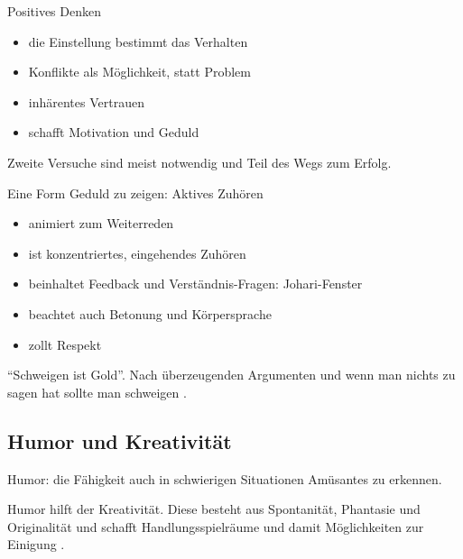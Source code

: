 \begin{frame}

  Positives Denken \cite[][p. 33ff]{mccarthy_advanced_2015}
  \begin{itemize}
    \item die Einstellung bestimmt das Verhalten
    \item Konflikte als Möglichkeit, statt Problem
    \item inhärentes Vertrauen
    \item schafft Motivation und Geduld
  \end{itemize}

  Zweite Versuche sind meist notwendig und Teil des Wegs zum Erfolg. 

\end{frame}

\begin{frame}

  Eine Form Geduld zu zeigen: Aktives Zuhören
  
  \begin{itemize}
    \item animiert zum Weiterreden
    \item ist konzentriertes, eingehendes Zuhören
    \item beinhaltet Feedback und Verständnis-Fragen: Johari-Fenster \cite[][p. 97]{mccarthy_advanced_2015} 
    \item beachtet auch Betonung und Körpersprache
    \item zollt Respekt
  \end{itemize}
    
  \enquote{Schweigen ist Gold}. Nach überzeugenden Argumenten und wenn man nichts zu sagen hat sollte man schweigen \cites{obermeier_karrieresprung_nodate}[][ch. 4.5.2]{helmold_verhandlungskonzepte_2019}.

\end{frame}


\subsection{Humor und Kreativität}

\begin{frame}
  Humor: die Fähigkeit auch in schwierigen Situationen Amüsantes zu erkennen. %

  Humor hilft der Kreativität. Diese besteht aus Spontanität, Phantasie und Originalität und schafft Handlungsspielräume und damit Möglichkeiten zur Einigung \cite{wannenwetsch_erfolgreicher_2009}.

\end{frame}

